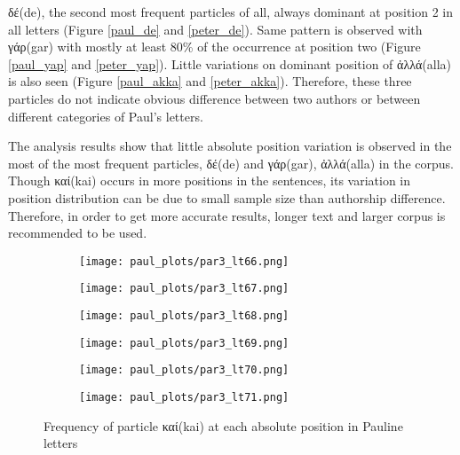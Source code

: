 \documentclass[a4paper]{article}
\begin{document}
\textgreek{δέ}(de), the second most frequent particles of all, always dominant at position 2 in all letters (Figure \ref{paul_de} and \ref{peter_de}). Same pattern is observed with \textgreek{γάρ}(gar) with mostly at least 80\% of the occurrence at position two (Figure \ref{paul_yap} and \ref{peter_yap}). Little variations on dominant position of \textgreek{ἀλλά}(alla) is also seen (Figure \ref{paul_akka} and \ref{peter_akka}). Therefore, these three particles do not indicate obvious difference between two authors or between different categories of Paul's letters. 

The analysis results show that little absolute position variation is observed in the most of the most frequent particles, \textgreek{δέ}(de) and \textgreek{γάρ}(gar), \textgreek{ἀλλά}(alla) in the corpus. Though \textgreek{καί}(kai) occurs in more positions in the sentences, its variation in position distribution can be due to small sample size than authorship difference. Therefore, in order to get more accurate results, longer text and larger corpus is recommended to be used. 

\begin{figure}
\begin{subfigure}{0.45\textwidth}
\centering
\texttt{[image: paul\_plots/par3\_lt66.png]}
\end{subfigure}
\begin{subfigure}{0.45\textwidth}
\centering
\texttt{[image: paul\_plots/par3\_lt67.png]}
\end{subfigure}
\begin{subfigure}{0.45\textwidth}
\centering
\texttt{[image: paul\_plots/par3\_lt68.png]}
\end{subfigure}
\begin{subfigure}{0.45\textwidth}
\centering
\texttt{[image: paul\_plots/par3\_lt69.png]}
\end{subfigure}
\begin{subfigure}{0.45\textwidth}
\centering
\texttt{[image: paul\_plots/par3\_lt70.png]}
\end{subfigure}
\begin{subfigure}{0.45\textwidth}
\centering
\texttt{[image: paul\_plots/par3\_lt71.png]}
\end{subfigure}
\caption{Frequency of particle \textgreek{καί}(kai) at each absolute position in Pauline letters}
\label{paul_kai}
\end{figure}
\end{document}

